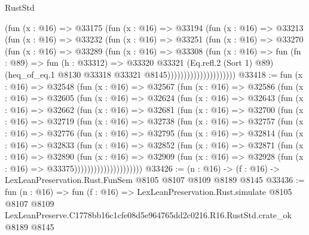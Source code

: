 \begin{lexlean}{RustStd}
\begin{coremodule}
                          (fun (x : @16) =>
                          @33175
                            (fun (x : @16) =>
                            @33194
                              (fun (x : @16) =>
                              @33213
                                (fun (x : @16) =>
                                @33232
                                  (fun (x : @16) =>
                                  @33251
                                    (fun (x : @16) =>
                                    @33270
                                      (fun (x : @16) =>
                                      @33289
                                        (fun (x : @16) =>
                                        @33308
                                          (fun (x : @16) =>
                                          fun (fn : @89) =>
                                          fun (h : @33312) =>
                                          @33320
                                            @33321
                                            (Eq.refl.{2} (Sort 1) @89)
                                            (heq_of_eq.{1}
                                              @8130
                                              @33318
                                              @33321
                                              @8145)))))))))))))))))))))
@33418 := fun (x : @16) =>
  @32548
    (fun (x : @16) =>
    @32567
      (fun (x : @16) =>
      @32586
        (fun (x : @16) =>
        @32605
          (fun (x : @16) =>
          @32624
            (fun (x : @16) =>
            @32643
              (fun (x : @16) =>
              @32662
                (fun (x : @16) =>
                @32681
                  (fun (x : @16) =>
                  @32700
                    (fun (x : @16) =>
                    @32719
                      (fun (x : @16) =>
                      @32738
                        (fun (x : @16) =>
                        @32757
                          (fun (x : @16) =>
                          @32776
                            (fun (x : @16) =>
                            @32795
                              (fun (x : @16) =>
                              @32814
                                (fun (x : @16) =>
                                @32833
                                  (fun (x : @16) =>
                                  @32852
                                    (fun (x : @16) =>
                                    @32871
                                      (fun (x : @16) =>
                                      @32890
                                        (fun (x : @16) =>
                                        @32909
                                          (fun (x : @16) =>
                                          @32928 (fun (x : @16) => @33375)))))))))))))))))))))
@33426 := (n : @16) -> (f : @16) -> LexLeanPreservation.Rust.FunSem @8105 @8107 @8109 @8189 @8145
@33436 := fun (n : @16) =>
  fun (f : @16) =>
  LexLeanPreservation.Rust.simulate
    @8105
    @8107
    @8109
    LexLeanPreserve.C1778bb16c1cfe08d5e964765dd2c0216.R16.RustStd.crate_ok
    @8189
    @8145
\end{coremodule}
\end{lexlean}
